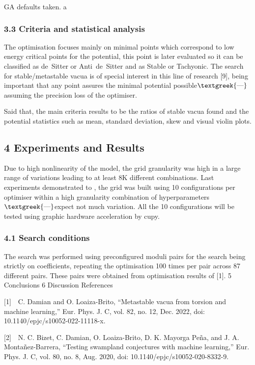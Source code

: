 \documentclass{article}
\begin{document}
GA defaults taken. a

\subsubsection{3.3 Criteria and statistical analysis}
The optimisation focuses mainly on minimal points which correspond to low energy critical points for the potential, this
point is later evaluated so it can be classified as de Sitter or Anti de Sitter and as Stable or Tachyonic. The search
for stable/metastable vacua is of special interest in this line of research [9], being important that any point assures
the minimal potential possible$\text{\textgreek{—}}$assuming the precision loss of the optimiser.

Said that, the main criteria results to be the ratios of stable vacua found and the potential statistics such as mean,
standard deviation, skew and visual violin plots.
\subsection{4 Experiments and Results}
Due to high nonlinearity of the model, the grid granularity was high in a large range of variations leading to at least
8K different combinations. Last experiments demonstrated to , the grid was built using 10 configurations per optimiser
within a high granularity combination of hyperparameters$\text{\textgreek{—}}$expect not much variation. All the 10
configurations will be tested using graphic hardware acceleration by cupy.

\subsubsection{4.1 Search conditions}
The search was performed using preconfigured moduli pairs for the search being strictly on coefficients, repeating the
optimisation 100 times per pair across 87 different pairs. These pairs were obtained from optimisation results of [1]. 
5 Conclusions
6 Discussion
References

[1]\ \ C. Damian and O. Loaiza-Brito, “Metastable vacua from torsion and machine learning,” Eur. Phys. J. C, vol. 82,
no. 12, Dec. 2022, doi: 10.1140/epjc/s10052-022-11118-x.

[2]\ \ N. C. Bizet, C. Damian, O. Loaiza-Brito, D. K. Mayorga Peña, and J. A. Montañez-Barrera, “Testing swampland
conjectures with machine learning,” Eur. Phys. J. C, vol. 80, no. 8, Aug. 2020, doi: 10.1140/epjc/s10052-020-8332-9.
\end{document}
